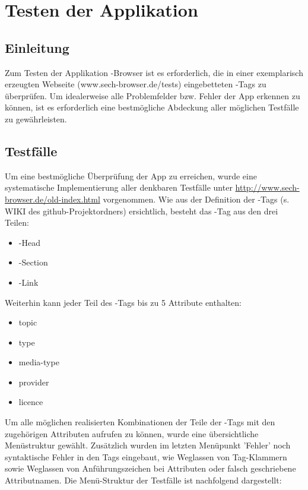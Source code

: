 \chapter{Testen der Applikation}

\section{Einleitung}

Zum Testen der Applikation \SECH-Browser ist es erforderlich, die in einer exemplarisch erzeugten Webseite (www.sech-browser.de/tests) eingebetteten \SEARCH-Tags zu überprüfen. Um idealerweise alle Problemfelder bzw. Fehler der App erkennen zu können, ist es erforderlich eine bestmögliche Abdeckung aller möglichen Testfälle zu gewährleisten.  

\section{Testfälle} 

Um eine bestmögliche Überprüfung der App zu erreichen, wurde eine systematische Implementierung aller denkbaren Testfälle unter \url{http://www.sech-browser.de/old-index.html} vorgenommen. Wie aus der Definition der \SEARCH-Tags (s. WIKI des github-Projektordners) ersichtlich, besteht das \SEARCH-Tag aus den drei Teilen:

\begin {itemize} 
   \item \SEARCH-Head
   \item \SEARCH-Section
   \item \SEARCH-Link
\end {itemize}

Weiterhin kann jeder Teil des \SEARCH-Tags bis zu 5 Attribute enthalten:

\begin {itemize}
   \item topic
   \item type
   \item media-type
   \item provider
   \item licence
\end {itemize}

Um alle möglichen realisierten Kombinationen der Teile der \SEARCH-Tags mit den zugehörigen Attributen aufrufen zu können, wurde eine übersichtliche Menüstruktur gewählt. Zusätzlich wurden im letzten Menüpunkt 'Fehler' noch syntaktische Fehler in den Tags eingebaut, wie Weglassen von Tag-Klammern sowie Weglassen von Anführungszeichen bei Attributen oder falsch geschriebene Attributnamen.   
Die Menü-Struktur der Testfälle ist nachfolgend dargestellt:

